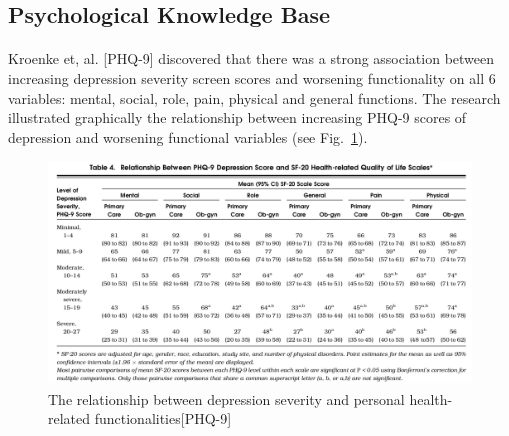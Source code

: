 \documentclass[runningheads]{llncs}
\begin{document}
\subsection{Psychological Knowledge Base}
%
\paragraph{}
Kroenke et, al. [PHQ-9] discovered that there was a strong association between increasing depression severity screen scores and worsening functionality on all 6 variables: mental, social, role, pain, physical and general functions. The research illustrated graphically the relationship between increasing PHQ-9 scores of depression and worsening functional variables (see Fig.~\ref{fig2}). 
\begin{figure}[h]
\includegraphics[width=1\textwidth]{phq-9.png}
\caption{The relationship between depression severity and personal health-related functionalities[PHQ-9]} \label{fig2}
\end{figure}
\end{document}
